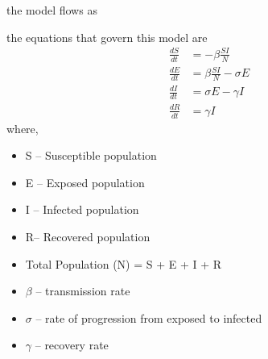 \documentclass{article}
\begin{document}
the model flows as 



the equations that govern this model are 
\begin{align}
\frac{dS}{dt} &= -\beta \frac{SI}{N} \\
\frac{dE}{dt} &= \beta \frac{SI}{N} - \sigma E \\
\frac{dI}{dt} &= \sigma E - \gamma I \\
\frac{dR}{dt} &= \gamma I
\end{align}
where,
\begin{itemize}

\item S -- Susceptible population
\item E -- Exposed population
\item I -- Infected population
\item R-- Recovered population
\item Total Population (N) = S + E + I + R
\item $\beta$ -- transmission rate
\item $\sigma$ -- rate of progression from exposed to infected
\item $\gamma$ -- recovery rate
\end{itemize}
\end{document}
